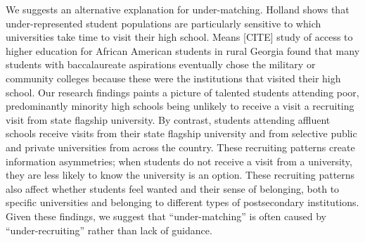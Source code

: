 \documentclass[twoside]{article}
\begin{document}
We suggests an alternative explanation for under-matching. Holland \citeyear{RN4324} shows that under-represented student populations are particularly sensitive to which universities take time to visit their high school. Means [CITE] study of access to higher education for African American students in rural Georgia found that many students with baccalaureate aspirations eventually chose the military or community colleges because these were the institutions that visited their high school. Our research findings paints a picture of talented students attending poor, predominantly minority high schools being unlikely to receive a visit a recruiting visit from state flagship university. By contrast, students attending affluent schools receive visits from their state flagship university and from selective public and private universities from across the country.  These recruiting patterns create information asymmetries; when students do not receive a visit from a university, they are less likely to know the university is an option. These recruiting patterns also affect whether students feel wanted and their sense of belonging, both to specific universities and belonging to different types of postsecondary institutions.  Given these findings, we suggest that ``under-matching'' is often caused by ``under-recruiting'' rather than lack of guidance.

\end{document}
